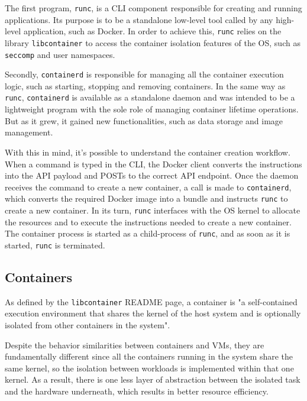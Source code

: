 The first program, \texttt{runc}, is a \acs{CLI} component responsible for creating and running applications. Its purpose is to be a standalone low-level tool called by any high-level application, such as Docker. In order to achieve this, \texttt{runc} relies on the library \texttt{libcontainer} to access the container isolation features of the \acs{OS}, such as \texttt{seccomp} and user namespaces\cite{runc-estes}.

Secondly, \texttt{containerd} is responsible for managing all the container execution logic, such as starting, stopping and removing containers. In the same way as \texttt{runc}, \texttt{containerd} is available as a standalone daemon and was intended to be a lightweight program with the sole role of managing container lifetime operations. But as it grew, it gained new functionalities, such as data storage and image management\cite{docker-containerd}.

With this in mind, it's possible to understand the container creation workflow. When a command is typed in the \acs{CLI}, the Docker client converts the instructions into the \acs{API} payload and POSTs to the correct API endpoint. Once the daemon receives the command to create a new container, a call is made to \texttt{containerd}, which converts the required Docker image into a bundle and instructs \texttt{runc} to create a new container. In its turn, \texttt{runc} interfaces with the \acs{OS} kernel to allocate the resources and to execute the instructions needed to create a new container. The container process is started as a child-process of \texttt{runc}, and as soon as it is started, \texttt{runc} is terminated.


\subsection{Containers}
\label{sec::arch:containers}
As defined by the \texttt{libcontainer} README page, a container is "a self-contained execution environment that shares the kernel of the host system and is optionally isolated from other containers in the system"\cite{docker-libcontainer}.

Despite the behavior similarities between containers and \acsp{VM}, they are fundamentally different since all the containers running in the system share the same kernel, so the isolation between workloads is implemented within that one kernel. As a result, there is one less layer of abstraction between the isolated task and the hardware underneath, which results in better resource efficiency.

